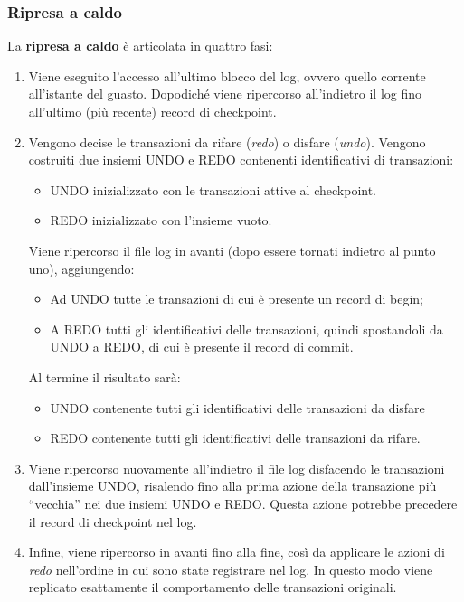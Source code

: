 \documentclass[a4paper]{article}
\newcommand{\dquotes}[1]{``#1''}
\begin{document}
	\subsubsection{Ripresa a caldo}
	
	La \textcolor{Red3}{\textbf{ripresa a caldo}} è articolata in quattro fasi:
	\begin{enumerate}
		\item Viene eseguito l'accesso all'ultimo blocco del log, ovvero quello corrente all'istante del guasto. Dopodiché viene ripercorso all'indietro il log fino all'ultimo (più recente) record di checkpoint.
		
		\item Vengono decise le transazioni da rifare (\emph{redo}) o disfare (\emph{undo}).\newline
		Vengono costruiti due insiemi UNDO e REDO contenenti identificativi di transazioni:
		\begin{itemize}
			\item UNDO inizializzato con le transazioni attive al checkpoint.
			\item REDO inizializzato con l'insieme vuoto.
		\end{itemize}
		Viene ripercorso il file log in avanti (dopo essere tornati indietro al punto uno), aggiungendo:
		\begin{itemize}
			\item Ad UNDO tutte le transazioni di cui è presente un record di \textsf{begin};
			\item A REDO tutti gli identificativi delle transazioni, quindi spostandoli da UNDO a REDO, di cui è presente il record di commit.
		\end{itemize}
		Al termine il risultato sarà:
		\begin{itemize}
			\item UNDO contenente tutti gli identificativi delle transazioni da disfare
			\item REDO contenente tutti gli identificativi delle transazioni da rifare.
		\end{itemize}
		
		\item Viene ripercorso nuovamente all'indietro il file log disfacendo le transazioni dall'insieme UNDO, risalendo fino alla prima azione della transazione più \dquotes{vecchia} nei due insiemi UNDO e REDO. Questa azione potrebbe precedere il record di checkpoint nel log.
		
		\item Infine, viene ripercorso in avanti fino alla fine, così da applicare le azioni di \emph{redo} nell'ordine in cui sono state registrare nel log. In questo modo viene replicato esattamente il comportamento delle transazioni originali.
	\end{enumerate}
\end{document}
